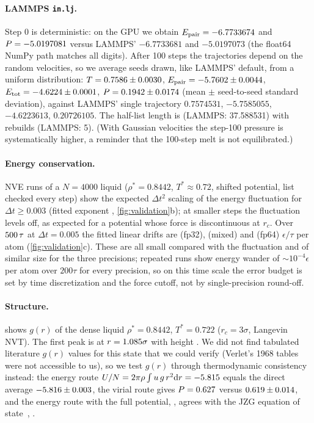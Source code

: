 \documentclass[11pt]{article}
\begin{document}
\paragraph{LAMMPS \texttt{in.lj}.} Step 0 is deterministic: on the GPU we obtain
$E_\mathrm{pair}=-6.7733674$ and $P=-5.0197081$ versus LAMMPS'
$-6.7733681$ and $-5.0197073$ (the float64 NumPy path matches all digits). After 100 steps the
trajectories depend on the random velocities, so we average \inljSeeds{} seeds drawn, like
LAMMPS' default, from a uniform distribution: $T=0.7586\pm0.0030$,
$E_\mathrm{pair}=-5.7602\pm0.0044$,
$E_\mathrm{tot}=-4.6224\pm0.0001$, $P=0.1942\pm0.0174$
(mean $\pm$ seed-to-seed standard deviation), against LAMMPS' single trajectory $0.7574531$,
$-5.7585055$, $-4.6223613$, $0.20726105$. The half-list length is \inljNeigh{} (LAMMPS:
37.588531) with \inljBuilds{} rebuilds (LAMMPS: 5). (With Gaussian velocities the step-100
pressure is systematically higher, a reminder that the 100-step melt is not equilibrated.)

\paragraph{Energy conservation.} NVE runs of a $N=4000$ liquid ($\rho^*=0.8442$, $T^*\approx0.72$,
shifted potential, list checked every step) show the expected $\Delta t^2$ scaling of the
energy fluctuation for $\Delta t\ge0.003$ (fitted exponent \fluctSlope,
\cref{fig:validation}b); at smaller steps the fluctuation levels off, as expected for a
potential whose force is discontinuous at $r_c$. Over $500\,\tau$ at $\Delta t=0.005$
the fitted linear drifts are \driftSingle{} (fp32), \driftMixed{} (mixed) and \driftDouble{}
(fp64) $\epsilon/\tau$ per atom (\cref{fig:validation}c). These are all small compared with the
fluctuation and of similar size for the three precisions; repeated runs show energy wander of
${\sim}10^{-4}\epsilon$ per atom over $200\tau$ for every precision, so on this time scale the
error budget is set by time discretization and the force cutoff, not by single-precision
round-off.

\paragraph{Structure.}  shows $g(r)$ of the dense liquid $\rho^*=0.8442$,
$T^*=0.722$ ($r_c=3\sigma$, Langevin NVT). The first peak is at $r=1.085\sigma$ with
height \rdfPeakG. We did not find tabulated literature $g(r)$ values for this state that we
could verify (Verlet's 1968 tables~\cite{verlet1968} were not accessible to us), so we test
$g(r)$ through thermodynamic consistency instead: the energy route
$U/N=2\pi\rho\int u\,g\,r^2\mathrm dr=-5.815$ equals the direct average
$-5.816\pm0.003$, the virial route gives $P=0.627$ versus
$0.619\pm0.014$, and the energy route with the full potential,
\rdfUrouteFull, agrees with the JZG equation of state~\cite{johnson1993lj}, \rdfUjzg.
\end{document}
